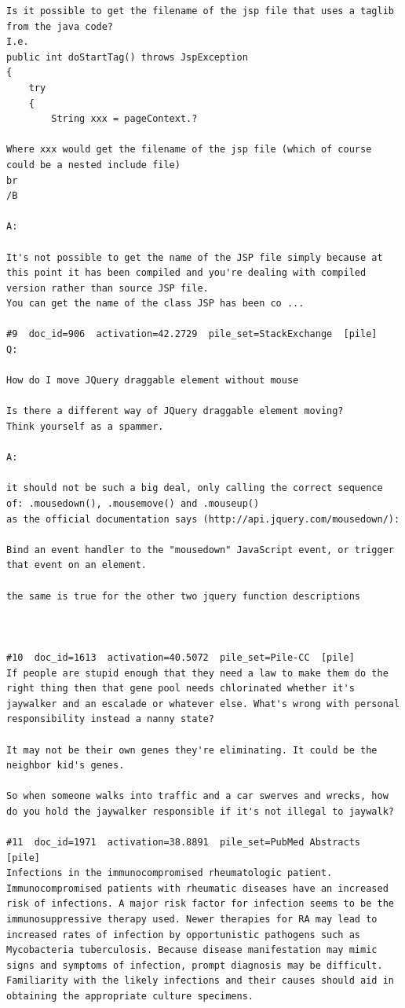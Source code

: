 \begin{verbatim}
Is it possible to get the filename of the jsp file that uses a taglib from the java code?
I.e.
public int doStartTag() throws JspException 
{
    try
    {
        String xxx = pageContext.?

Where xxx would get the filename of the jsp file (which of course could be a nested include file)
br
/B

A:

It's not possible to get the name of the JSP file simply because at this point it has been compiled and you're dealing with compiled version rather than source JSP file.
You can get the name of the class JSP has been co ...

#9  doc_id=906  activation=42.2729  pile_set=StackExchange  [pile]
Q:

How do I move JQuery draggable element without mouse

Is there a different way of JQuery draggable element moving?
Think yourself as a spammer.

A:

it should not be such a big deal, only calling the correct sequence of: .mousedown(), .mousemove() and .mouseup()
as the official documentation says (http://api.jquery.com/mousedown/):

Bind an event handler to the "mousedown" JavaScript event, or trigger that event on an element.

the same is true for the other two jquery function descriptions



#10  doc_id=1613  activation=40.5072  pile_set=Pile-CC  [pile]
If people are stupid enough that they need a law to make them do the right thing then that gene pool needs chlorinated whether it's jaywalker and an escalade or whatever else. What's wrong with personal responsibility instead a nanny state?

It may not be their own genes they're eliminating. It could be the neighbor kid's genes.

So when someone walks into traffic and a car swerves and wrecks, how do you hold the jaywalker responsible if it's not illegal to jaywalk?

#11  doc_id=1971  activation=38.8891  pile_set=PubMed Abstracts  [pile]
Infections in the immunocompromised rheumatologic patient.
Immunocompromised patients with rheumatic diseases have an increased risk of infections. A major risk factor for infection seems to be the immunosuppressive therapy used. Newer therapies for RA may lead to increased rates of infection by opportunistic pathogens such as Mycobacteria tuberculosis. Because disease manifestation may mimic signs and symptoms of infection, prompt diagnosis may be difficult. Familiarity with the likely infections and their causes should aid in obtaining the appropriate culture specimens.


\end{verbatim}
